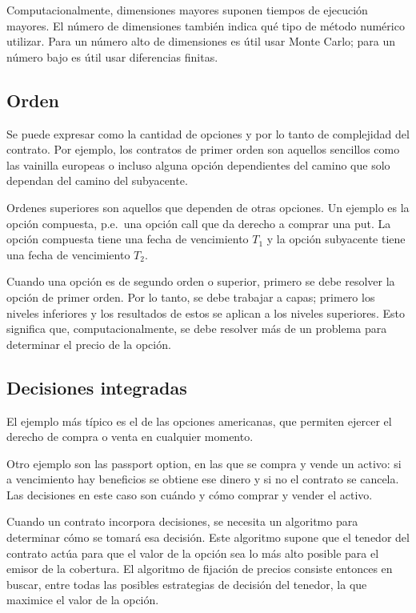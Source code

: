 Computacionalmente, dimensiones mayores suponen tiempos de ejecución mayores. El número de dimensiones también indica qué tipo de método numérico utilizar. Para un número alto de dimensiones es útil usar Monte Carlo; para un número bajo es útil usar diferencias finitas.





\subsection{Orden}
Se puede expresar como la cantidad de opciones y por lo tanto de complejidad del contrato. Por ejemplo, los contratos de primer orden son aquellos sencillos como las vainilla europeas o incluso alguna opción dependientes del camino que solo dependan del camino del subyacente. 

Ordenes superiores son aquellos que dependen de otras opciones. Un ejemplo es la opción compuesta, p.e.\ una opción call que da derecho a comprar una put. La opción compuesta tiene una fecha de vencimiento $T_1$ y la opción subyacente tiene una fecha de vencimiento $T_2$.

Cuando una opción es de segundo orden o superior, primero se debe resolver la opción de primer orden. Por lo tanto, se debe trabajar a capas; primero los niveles inferiores y los resultados de estos se aplican a los niveles superiores. Esto significa que, computacionalmente, se debe resolver más de un problema para determinar el precio de la opción.





\subsection{Decisiones integradas}
El ejemplo más típico es el de las opciones americanas, que permiten ejercer el derecho de compra o venta en cualquier momento. 

Otro ejemplo son las passport option, en las que se compra y vende un activo: si a vencimiento hay beneficios se obtiene ese dinero y si no el contrato se cancela. Las decisiones en este caso son cuándo y cómo comprar y vender el activo.

Cuando un contrato incorpora decisiones, se necesita un algoritmo para determinar cómo se tomará esa decisión. Este algoritmo supone que el tenedor del contrato actúa para que el valor de la opción sea lo más alto posible para el emisor de la cobertura. El algoritmo de fijación de precios consiste entonces en buscar, entre todas las posibles estrategias de decisión del tenedor, la que maximice el valor de la opción.

